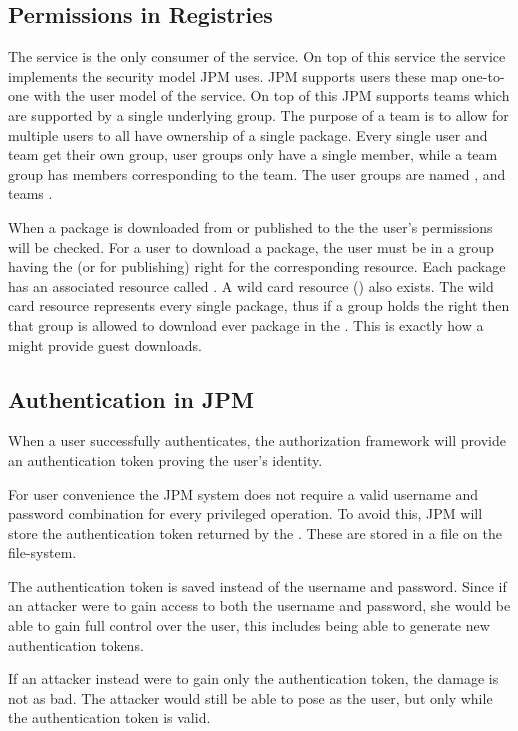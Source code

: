 \subsection{Permissions in Registries}

The \registry service is the only consumer of the \security service. On top of
this service the \registry service implements the security model JPM uses. JPM
supports users these map one-to-one with the user model of the \security
service. On top of this JPM supports teams which are supported by a single
underlying group. The purpose of a team is to allow for multiple users to all
have ownership of a single package. Every single user and team get their own
group, user groups only have a single member, while a team group has members
corresponding to the team. The user groups are named , and
teams .

When a package is downloaded from or published to the \registry the user's
permissions will be checked. For a user to download a package, the user must be
in a group having the  (or  for publishing) right for
the corresponding resource. Each package has an associated resource called
. A wild card resource () also exists.
The wild card resource represents every single package, thus if a group holds
the  right then that group is allowed to download ever
package in the \registry. This is exactly how a \registry might provide guest
downloads.

\subsection{Authentication in JPM}

When a user successfully authenticates, the authorization framework will
provide an authentication token proving the user's identity.

For user convenience the JPM system does not require a valid username and
password combination for every privileged operation. To avoid this, JPM will
store the authentication token returned by the \registry. These are stored in a
file on the file-system.

The authentication token is saved instead of the username and password.  Since
if an attacker were to gain access to both the username and password, she would
be able to gain full control over the user, this includes being able to
generate new authentication tokens.

If an attacker instead were to gain only the authentication token, the damage
is not as bad. The attacker would still be able to pose as the user, but only
while the authentication token is valid.
